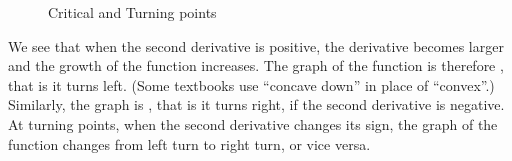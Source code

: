 \begin{figure}
\begin{center}
\end{center}
\caption{Critical and Turning points}
\label{figkurvdiss3}
\end{figure}
We see that when the second derivative is positive, the derivative becomes
larger and the growth of the function increases. The graph of the function
is therefore , that is it turns left.
(Some textbooks use ``concave down'' in place of ``convex''.) Similarly, the
graph is , that is it turns right, if the second derivative
is negative. 
At turning points, when the second derivative changes its sign, the graph of
the function changes from left turn to right turn, or vice versa.
\medskip

